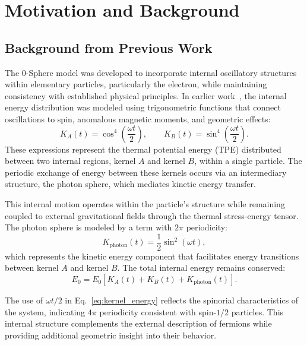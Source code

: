 \documentclass[%
 reprint,
 amsmath,amssymb,
 aps,
]{revtex4-1}
\numberwithin{equation}{section}%
\begin{document}
\section{Motivation and Background}
\label{sec:Motivation}

\subsection{Background from Previous Work}

The 0-Sphere model was developed to incorporate internal oscillatory structures within elementary particles, particularly the electron, while maintaining consistency with established physical principles. In earlier work~\cite{hanamura2309.0047, hanamura2506.0031}, the internal energy distribution was modeled using trigonometric functions that connect oscillations to spin, anomalous magnetic moments, and geometric effects:
\begin{equation} \label{eq:kernel_energy}
K_A(t) = \cos^4\left(\frac{\omega t}{2}\right), \qquad K_B(t) = \sin^4\left(\frac{\omega t}{2}\right).
\end{equation}
These expressions represent the thermal potential energy (TPE) distributed between two internal regions, kernel $A$ and kernel $B$, within a single particle. The periodic exchange of energy between these kernels occurs via an intermediary structure, the photon sphere, which mediates kinetic energy transfer.

This internal motion operates within the particle's structure while remaining coupled to external gravitational fields through the thermal stress-energy tensor. The photon sphere is modeled by a term with $2\pi$ periodicity:
\begin{equation} \label{eq:photon_sphere}
K_{\text{photon}}(t) = \frac{1}{2} \sin^2(\omega t),
\end{equation}
which represents the kinetic energy component that facilitates energy transitions between kernel $A$ and kernel $B$. The total internal energy remains conserved:
\begin{equation} \label{eq:total_energy}
E_0 = E_0 \left[ K_A(t) + K_B(t) + K_{\text{photon}}(t) \right].
\end{equation}

The use of $\omega t / 2$ in Eq.~\eqref{eq:kernel_energy} reflects the spinorial characteristics of the system, indicating $4\pi$ periodicity consistent with spin-$1/2$ particles. This internal structure complements the external description of fermions while providing additional geometric insight into their behavior.
\end{document}
